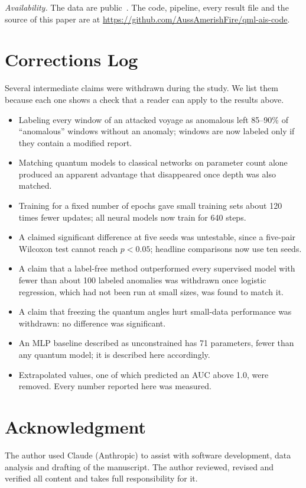 \documentclass[journal]{IEEEtran}
\begin{document}
\textit{Availability.} The data are public~\cite{marinecadastre}. The code,
pipeline, every result file and the source of this paper are at
\url{https://github.com/AussAmerishFire/qml-ais-code}.

\section{Corrections Log}
\label{app:corrections}
Several intermediate claims were withdrawn during the study. We list them
because each one shows a check that a reader can apply to the results above.
\begin{itemize}
  \item Labeling every window of an attacked voyage as anomalous left 85--90\%
  of ``anomalous'' windows without an anomaly; windows are now labeled only if
  they contain a modified report.
  \item Matching quantum models to classical networks on parameter count alone
  produced an apparent advantage that disappeared once depth was also matched.
  \item Training for a fixed number of epochs gave small training sets about
  120 times fewer updates; all neural models now train for 640 steps.
  \item A claimed significant difference at five seeds was untestable, since a
  five-pair Wilcoxon test cannot reach $p<0.05$; headline comparisons now use
  ten seeds.
  \item A claim that a label-free method outperformed every supervised model
  with fewer than about 100 labeled anomalies was withdrawn once logistic
  regression, which had not been run at small sizes, was found to match it.
  \item A claim that freezing the quantum angles hurt small-data performance was
  withdrawn: no difference was significant.
  \item An MLP baseline described as unconstrained has 71 parameters, fewer than
  any quantum model; it is described here accordingly.
  \item Extrapolated values, one of which predicted an AUC above 1.0, were
  removed. Every number reported here was measured.
\end{itemize}

\section*{Acknowledgment}
The author used Claude (Anthropic) to assist with software development, data
analysis and drafting of the manuscript. The author reviewed, revised and
verified all content and takes full responsibility for it.



\end{document}
